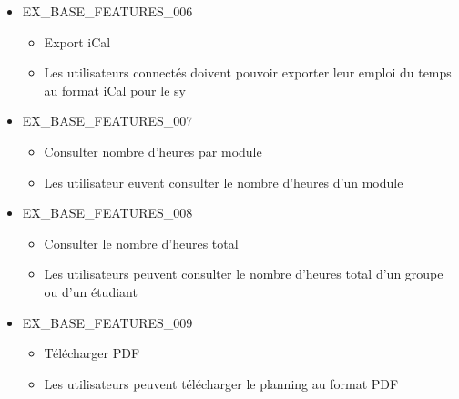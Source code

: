 \documentclass[french]{scrartcl}
\begin{document}
\begin{itemize}
        \item EX\_BASE\_FEATURES\_006
        \begin{itemize}
            \item Export iCal
            \item Les utilisateurs connectés doivent pouvoir exporter leur emploi du temps au format iCal pour le sy
        \end{itemize}

        \item EX\_BASE\_FEATURES\_007
        \begin{itemize}
            \item Consulter nombre d'heures par module
            \item Les utilisateur euvent consulter le nombre d'heures d'un module
        \end{itemize}

        \item EX\_BASE\_FEATURES\_008
        \begin{itemize}
            \item Consulter le nombre d'heures total
            \item Les utilisateurs peuvent consulter le nombre d'heures total d'un groupe ou d'un étudiant
        \end{itemize}

        \item EX\_BASE\_FEATURES\_009
        \begin{itemize}
            \item Télécharger PDF
            \item Les utilisateurs peuvent télécharger le planning au format PDF
        \end{itemize}
    \end{itemize}
\end{document}

